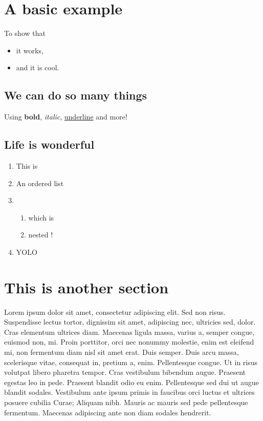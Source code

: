 \documentclass[
]{article}
\author{}
\date{}
\providecommand{\tightlist}{%
  \setlength{\itemsep}{0pt}\setlength{\parskip}{0pt}}
\begin{document}
\hypertarget{a-basic-example}{%
\section{A basic example}\label{a-basic-example}}

To show that

\begin{itemize}
\tightlist
\item
  it works,
\item
  and it is cool.
\end{itemize}

\hypertarget{we-can-do-so-many-things}{%
\subsection{We can do so many things}\label{we-can-do-so-many-things}}

Using \textbf{bold}, \emph{italic}, \uline{underline} and more!

\hypertarget{life-is-wonderful}{%
\subsection{Life is wonderful}\label{life-is-wonderful}}

\begin{enumerate}
\item
  This is
\item
  An ordered list
\item
  \begin{enumerate}
  \tightlist
  \item
    which is
  \item
    nested !
  \end{enumerate}
\item
  YOLO
\end{enumerate}

\hypertarget{this-is-another-section}{%
\section{This is another section}\label{this-is-another-section}}

Lorem ipsum dolor sit amet, consectetur adipiscing elit. Sed non risus.
Suspendisse lectus tortor, dignissim sit amet, adipiscing nec, ultricies
sed, dolor. Cras elementum ultrices diam. Maecenas ligula massa, varius
a, semper congue, euismod non, mi. Proin porttitor, orci nec nonummy
molestie, enim est eleifend mi, non fermentum diam nisl sit amet erat.
Duis semper. Duis arcu massa, scelerisque vitae, consequat in, pretium
a, enim. Pellentesque congue. Ut in risus volutpat libero pharetra
tempor. Cras vestibulum bibendum augue. Praesent egestas leo in pede.
Praesent blandit odio eu enim. Pellentesque sed dui ut augue blandit
sodales. Vestibulum ante ipsum primis in faucibus orci luctus et
ultrices posuere cubilia Curae; Aliquam nibh. Mauris ac mauris sed pede
pellentesque fermentum. Maecenas adipiscing ante non diam sodales
hendrerit.
\end{document}
